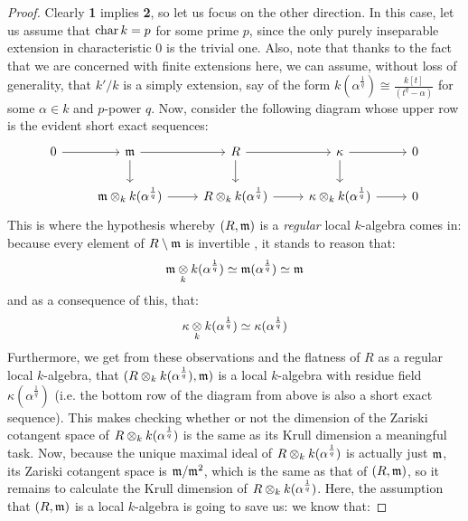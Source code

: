                     \begin{proof}
                        Clearly \textbf{1} implies \textbf{2}, so let us focus on the other direction. In this case, let us assume that $\operatorname{char} k = p$ for some prime $p$, since the only purely inseparable extension in characteristic $0$ is the trivial one. Also, note that thanks to the fact that we are concerned with finite extensions here, we can assume, without loss of generality, that $k'/k$ is a simply extension, say of the form $k(\alpha^{\frac1q}) \cong \frac{k[t]}{(t^q - \alpha)}$ for some $\alpha \in k$ and $p$-power $q$. Now, consider the following diagram whose upper row is the evident short exact sequences:
                            $$
                                \begin{tikzcd}
                                	0 & \m & R & \kappa & 0 \\
                                	& {\m \tensor_k k(\alpha^{\frac1q})} & {R \tensor_k k(\alpha^{\frac1q})} & {\kappa \tensor_k k(\alpha^{\frac1q})} & 0
                                	\arrow[from=1-1, to=1-2]
                                	\arrow[from=1-2, to=1-3]
                                	\arrow[from=1-3, to=1-4]
                                	\arrow[from=1-4, to=1-5]
                                	\arrow[from=2-2, to=2-3]
                                	\arrow[from=2-3, to=2-4]
                                	\arrow[from=2-4, to=2-5]
                                	\arrow[from=1-4, to=2-4]
                                	\arrow[from=1-3, to=2-3]
                                	\arrow[from=1-2, to=2-2]
                                \end{tikzcd}
                            $$
                        This is where the hypothesis whereby $(R, \mathfrak{m})$ is a \textit{regular} local $k$-algebra comes in: because every element of $R \setminus \mathfrak{m}$ is invertible \cite[\href{https://stacks.math.columbia.edu/tag/00E9}{Tag 00E9}]{stacks}, it stands to reason that:
                            $$\m \tensor_k k(\alpha^{\frac1q}) \cong \m(\alpha^{\frac1q}) \cong \m$$
                        and as a consequence of this, that:
                            $$\kappa \tensor_k k(\alpha^{\frac1q}) \cong \kappa(\alpha^{\frac1q})$$
                        Furthermore, we get from these observations and the flatness of $R$ as a regular local $k$-algebra, that $(R \tensor_k k(\alpha^{\frac1q}), \m)$ is a local $k$-algebra with residue field $\kappa(\alpha^{\frac1q})$ (i.e. the bottom row of the diagram from above is also a short exact sequence). This makes checking whether or not the dimension of the Zariski cotangent space of $R \tensor_k k(\alpha^{\frac1q})$ is the same as its Krull dimension a meaningful task. Now, because the unique maximal ideal of $R \tensor_k k(\alpha^{\frac1q})$ is actually just $\mathfrak{m}$, its Zariski cotangent space is $\mathfrak{m}/\mathfrak{m}^2$, which is the same as that of $(R, \mathfrak{m})$, so it remains to calculate the Krull dimension of $R \tensor_k k(\alpha^{\frac1q})$. Here, the assumption that $(R, \mathfrak{m})$ is a local $k$-algebra is going to save us: we know that:

\end{proof}
